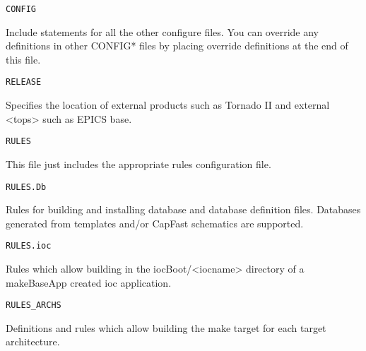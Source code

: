 \begin{description}
\end{description}\begin{verbatim}CONFIG
\end{verbatim}\begin{description}\item Include statements for all the other configure files. You can override any definitions in other CONFIG* files by 
placing override definitions at the end of this file.

\end{description}\begin{verbatim}RELEASE
\end{verbatim}\begin{description}\item Specifies the location of external products such as Tornado II and external \textless{}tops\textgreater{} such as EPICS base. 

\end{description}\begin{verbatim}RULES
\end{verbatim}\begin{description}\item This file just includes the appropriate rules configuration file.

\end{description}\begin{verbatim}RULES.Db
\end{verbatim}\begin{description}\item Rules for building and installing database and database definition files. Databases generated from templates and/or 
CapFast schematics are supported.

\end{description}\begin{verbatim}RULES.ioc
\end{verbatim}\begin{description}\item Rules which allow building in the iocBoot/\textless{}iocname\textgreater{} directory of a makeBaseApp created ioc application.

\end{description}\begin{verbatim}RULES_ARCHS
\end{verbatim}\begin{description}\item Definitions and rules which allow building the make target for each target architecture.


\end{description}
